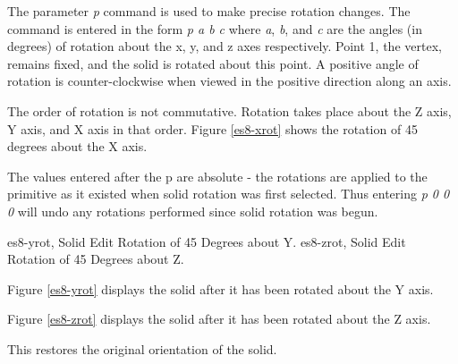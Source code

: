 
The parameter {\em p} command is used to make precise rotation changes.
The
command is entered in the form {\em p a b c} where
{\em a}, {\em b}, and {\em c} are the angles
(in degrees) of rotation about the x, y, and z axes respectively.  Point 1,
the vertex, remains fixed, and the solid is rotated about this point.  A
positive angle of rotation is counter-clockwise when viewed in the positive
direction along an axis.

The order of rotation is not commutative.
Rotation takes place about the
Z axis, Y axis, and X axis in that order.
Figure \ref{es8-xrot} shows the rotation of 45 degrees about the X axis.


The values entered after the p are absolute - the rotations are applied to
the primitive as it existed when solid rotation was first selected.  Thus
entering {\em p 0 0 0} will undo any rotations
performed since solid rotation was begun.

\mfig es8-yrot, Solid Edit Rotation of 45 Degrees about Y.
\mfig es8-zrot, Solid Edit Rotation of 45 Degrees about Z.


Figure \ref{es8-yrot} displays the solid
after it has been rotated about the Y axis.


Figure \ref{es8-zrot} displays the solid
after it has been rotated about the Z axis.


This restores the original orientation of the solid.

